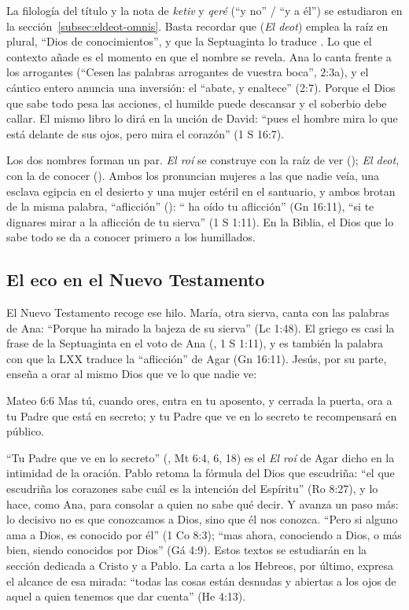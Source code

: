 La filología del título y la nota de \emph{ketiv} y \emph{qeré} (``y no'' / ``y a él'') se estudiaron en la sección~\ref{subsec:eldeot-omnis}. Basta recordar que  (\emph{El deot}) emplea la raíz  en plural, ``Dios de conocimientos'', y que la Septuaginta lo traduce . Lo que el contexto añade es el momento en que el nombre se revela. Ana lo canta frente a los arrogantes (``Cesen las palabras arrogantes de vuestra boca'', 2:3a), y el cántico entero anuncia una inversión: el \SENOR{} ``abate, y enaltece'' (2:7). Porque el Dios que sabe todo pesa las acciones, el humilde puede descansar y el soberbio debe callar. El mismo libro lo dirá en la unción de David: ``pues el hombre mira lo que está delante de sus ojos, pero \SENOR{} mira el corazón'' (1 S 16:7).

Los dos nombres forman un par. \emph{El roí} se construye con la raíz de ver (); \emph{El deot}, con la de conocer (). Ambos los pronuncian mujeres a las que nadie veía, una esclava egipcia en el desierto y una mujer estéril en el santuario, y ambos brotan de la misma palabra, ``aflicción'' (): ``\SENOR{} ha oído tu aflicción'' (Gn 16:11), ``si te dignares mirar a la aflicción de tu sierva'' (1 S 1:11). En la Biblia, el Dios que lo sabe todo se da a conocer primero a los humillados.

\subsection{El eco en el Nuevo Testamento}

El Nuevo Testamento recoge ese hilo. María, otra sierva, canta con las palabras de Ana: ``Porque ha mirado la bajeza de su sierva'' (Lc 1:48). El griego  es casi la frase de la Septuaginta en el voto de Ana (, 1 S 1:11), y  es también la palabra con que la LXX traduce la ``aflicción'' de Agar (Gn 16:11). Jesús, por su parte, enseña a orar al mismo Dios que ve lo que nadie ve:

\begin{verso}{Mateo 6:6}
Mas tú, cuando ores, entra en tu aposento, y cerrada la puerta, ora a tu Padre que está en secreto; y tu Padre que ve en lo secreto te recompensará en público.
\end{verso}

``Tu Padre que ve en lo secreto'' (, Mt 6:4, 6, 18) es el \emph{El roí} de Agar dicho en la intimidad de la oración. Pablo retoma la fórmula del Dios que escudriña: ``el que escudriña los corazones sabe cuál es la intención del Espíritu'' (Ro 8:27), y lo hace, como Ana, para consolar a quien no sabe qué decir. Y avanza un paso más: lo decisivo no es que conozcamos a Dios, sino que él nos conozca. ``Pero si alguno ama a Dios, es conocido por él'' (1 Co 8:3); ``mas ahora, conociendo a Dios, o más bien, siendo conocidos por Dios'' (Gá 4:9). Estos textos se estudiarán en la sección dedicada a Cristo y a Pablo. La carta a los Hebreos, por último, expresa el alcance de esa mirada: ``todas las cosas están desnudas y abiertas a los ojos de aquel a quien tenemos que dar cuenta'' (He 4:13).

